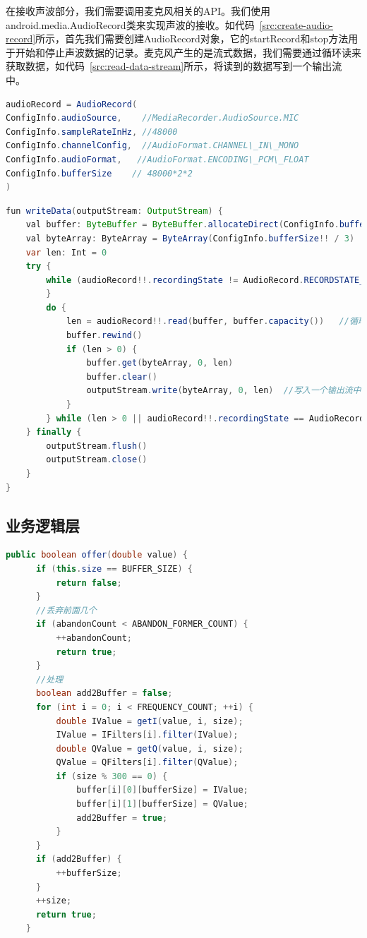 在接收声波部分，我们需要调用麦克风相关的API。我们使用android.media.AudioRecord类来实现声波的接收。如代码~\ref{src:create-audio-record}所示，首先我们需要创建AudioRecord对象，它的startRecord和stop方法用于开始和停止声波数据的记录。麦克风产生的是流式数据，我们需要通过循环读来获取数据，如代码~\ref{src:read-data-stream}所示，将读到的数据写到一个输出流中。
\begin{lstlisting}[language={Java}, caption={创建AudioRecord对象 \label{src:create-audio-record}} ]
audioRecord = AudioRecord(
ConfigInfo.audioSource,    //MediaRecorder.AudioSource.MIC
ConfigInfo.sampleRateInHz, //48000
ConfigInfo.channelConfig,  //AudioFormat.CHANNEL\_IN\_MONO
ConfigInfo.audioFormat,   //AudioFormat.ENCODING\_PCM\_FLOAT
ConfigInfo.bufferSize    // 48000*2*2
)
\end{lstlisting}

\begin{lstlisting}[language={Java}, caption={读取数据流 \label{src:read-data-stream}} ]
fun writeData(outputStream: OutputStream) {
    val buffer: ByteBuffer = ByteBuffer.allocateDirect(ConfigInfo.bufferSize!! / 3) //创建Direct内存缓存区
    val byteArray: ByteArray = ByteArray(ConfigInfo.bufferSize!! / 3)   //创建缓存数组
    var len: Int = 0
    try {
        while (audioRecord!!.recordingState != AudioRecord.RECORDSTATE_RECORDING) {
        }
        do {
            len = audioRecord!!.read(buffer, buffer.capacity())   //循环读取数据流
            buffer.rewind()
            if (len > 0) {
                buffer.get(byteArray, 0, len)
                buffer.clear()
                outputStream.write(byteArray, 0, len)  //写入一个输出流中
            }
        } while (len > 0 || audioRecord!!.recordingState == AudioRecord.RECORDSTATE_RECORDING)
    } finally {
        outputStream.flush()
        outputStream.close()
    }
}
\end{lstlisting}


\subsection{业务逻辑层}

\begin{lstlisting}[language={Java}, caption={实时信号下转化 \label{src:signal-down-conversion}} ]
public boolean offer(double value) {
      if (this.size == BUFFER_SIZE) {
          return false;
      }
      //丢弃前面几个
      if (abandonCount < ABANDON_FORMER_COUNT) {
          ++abandonCount;
          return true;
      }
      //处理
      boolean add2Buffer = false;
      for (int i = 0; i < FREQUENCY_COUNT; ++i) {
          double IValue = getI(value, i, size);
          IValue = IFilters[i].filter(IValue);
          double QValue = getQ(value, i, size);
          QValue = QFilters[i].filter(QValue);
          if (size % 300 == 0) {
              buffer[i][0][bufferSize] = IValue;
              buffer[i][1][bufferSize] = QValue;
              add2Buffer = true;
          }
      }
      if (add2Buffer) {
          ++bufferSize;
      }
      ++size;
      return true;
    }
\end{lstlisting}

